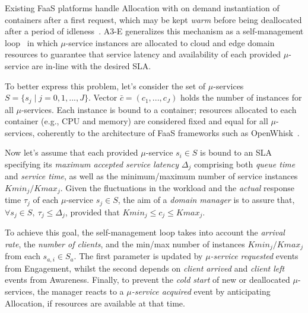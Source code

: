 

Existing FaaS platforms handle Allocation with on demand instantiation of containers after a first request, which may be kept \textit{warm} before being deallocated after a period of idleness~\cite{AWSLambda, OpenWhisk}. A3-E generalizes this mechanism as a self-management loop~\cite{kephart2003vision}
in which $\mu$-service instances are allocated to cloud and edge domain resources to guarantee that service latency and availability of each provided $\mu$-service are in-line with the desired SLA. 

To better express this problem, let's consider the set of $\mu$-services $S = \{s_j \mid j = 0,1,...,J\}$.
Vector $\bar{c} = (c_1, ..., c_J)$ holds the number of instances for all $\mu$-services. Each instance is bound to a container; resources allocated to each container 
(e.g., CPU and memory) are considered fixed and equal for all $\mu$-services, coherently to the architecture of FaaS frameworks such as OpenWhisk~\cite{OpenWhisk}.

Now let's assume that each provided $\mu$-service $s_i \in S$ is bound to an SLA specifying its \textit{maximum accepted service latency} $\Delta_j$ comprising both \textit{queue time} and \textit{service time}, as well as the minimum/maximum number of service instances $Kmin_{j}/Kmax_{j}$. %
Given the fluctuations in the workload and the \textit{actual} response time $\tau_j$ of each $\mu$-service $s_j \in S$, the aim of a \textit{domain manager} is to assure that, $\forall s_j \in S,\ \tau_j \le \Delta_j$, provided that $Kmin_j \le c_j \le Kmax_j$. 

To achieve this goal, the self-management loop takes into account the \textit{arrival rate}, the \textit{number of clients}, and the min/max number of instances $Kmin_{j}/Kmax_{j}$ from each $s_{a,i} \in S_a$. The first parameter is updated by \textit{$\mu$-service requested} events from Engagement, whilst the second depends on \textit{client arrived} and \textit{client left} events from Awareness. Finally, to prevent the \textit{cold start} of new or deallocated $\mu$-services, the manager reacts to a \textit{$\mu$-service acquired} event by anticipating Allocation, if resources are available at that time. 

